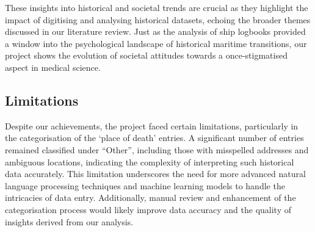 These insights into historical and societal trends are crucial as they highlight the impact of digitising and analysing historical datasets, echoing the broader themes discussed in our literature review. Just as the analysis of ship logbooks \parencite{petrakis_2021_ship} provided a window into the psychological landscape of historical maritime transitions, our project shows the evolution of societal attitudes towards a once-stigmatised aspect in medical science.

\subsection{Limitations}
Despite our achievements, the project faced certain limitations, particularly in the categorisation of the `place of death' entries. A significant number of entries remained classified under ``Other'', including those with misspelled addresses and ambiguous locations, indicating the complexity of interpreting such historical data accurately. This limitation underscores the need for more advanced natural language processing techniques and machine learning models to handle the intricacies of data entry. Additionally, manual review and enhancement of the categorisation process would likely improve data accuracy and the quality of insights derived from our analysis.